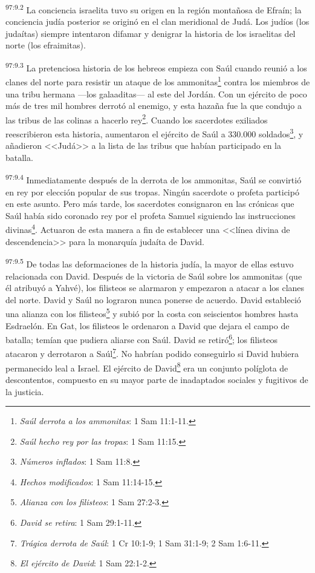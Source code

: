 \par
\textsuperscript{97:9.2} La conciencia israelita tuvo su origen en la región montañosa de Efraín; la conciencia judía posterior se originó en el clan meridional de Judá. Los judíos (los judaítas) siempre intentaron difamar y denigrar la historia de los israelitas del norte (los efraimitas).

\par
\textsuperscript{97:9.3} La pretenciosa historia de los hebreos empieza con Saúl cuando reunió a los clanes del norte para resistir un ataque de los ammonitas\footnote{\textit{Saúl derrota a los ammonitas}: 1 Sam 11:1-11.} contra los miembros de una tribu hermana ---los galaaditas--- al este del Jordán. Con un ejército de poco más de tres mil hombres derrotó al enemigo, y esta hazaña fue la que condujo a las tribus de las colinas a hacerlo rey\footnote{\textit{Saúl hecho rey por las tropas}: 1 Sam 11:15.}. Cuando los sacerdotes exiliados reescribieron esta historia, aumentaron el ejército de Saúl a 330.000 soldados\footnote{\textit{Números inflados}: 1 Sam 11:8.}, y añadieron <<Judá>> a la lista de las tribus que habían participado en la batalla.

\par
\textsuperscript{97:9.4} Inmediatamente después de la derrota de los ammonitas, Saúl se convirtió en rey por elección popular de sus tropas. Ningún sacerdote o profeta participó en este asunto. Pero más tarde, los sacerdotes consignaron en las crónicas que Saúl había sido coronado rey por el profeta Samuel siguiendo las instrucciones divinas\footnote{\textit{Hechos modificados}: 1 Sam 11:14-15.}. Actuaron de esta manera a fin de establecer una <<línea divina de descendencia>> para la monarquía judaíta de David.

\par
\textsuperscript{97:9.5} De todas las deformaciones de la historia judía, la mayor de ellas estuvo relacionada con David. Después de la victoria de Saúl sobre los ammonitas (que él atribuyó a Yahvé), los filisteos se alarmaron y empezaron a atacar a los clanes del norte. David y Saúl no lograron nunca ponerse de acuerdo. David estableció una alianza con los filisteos\footnote{\textit{Alianza con los filisteos}: 1 Sam 27:2-3.} y subió por la costa con seiscientos hombres hasta Esdraelón. En Gat, los filisteos le ordenaron a David que dejara el campo de batalla; temían que pudiera aliarse con Saúl. David se retiró\footnote{\textit{David se retira}: 1 Sam 29:1-11.}; los filisteos atacaron y derrotaron a Saúl\footnote{\textit{Trágica derrota de Saúl}: 1 Cr 10:1-9; 1 Sam 31:1-9; 2 Sam 1:6-11.}. No habrían podido conseguirlo si David hubiera permanecido leal a Israel. El ejército de David\footnote{\textit{El ejército de David}: 1 Sam 22:1-2.} era un conjunto políglota de descontentos, compuesto en su mayor parte de inadaptados sociales y fugitivos de la justicia.

